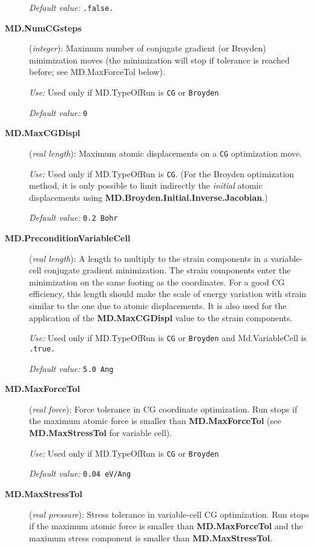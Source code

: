 \documentclass[11pt]{article}
\begin{document}
\begin{description}
{\it Default value:} {\tt .false.}


\item[{\bf MD.NumCGsteps}] ({\it integer}): 
Maximum number of conjugate gradient (or Broyden) minimization
moves (the minimization will stop
if tolerance is reached before; see MD.MaxForceTol below).

{\it Use:} Used only if MD.TypeOfRun is {\tt CG} or {\tt Broyden}
    
{\it Default value:} {\tt 0}

\item[{\bf MD.MaxCGDispl}] ({\it real length}): 
Maximum atomic displacements on a {\tt CG} optimization move.

{\it Use:} Used only if MD.TypeOfRun is {\tt CG}. (For the Broyden
optimization method, it is only possible to limit indirectly the {\it initial\/}
atomic displacements using {\bf MD.Broyden.Initial.Inverse.Jacobian}.)
    
{\it Default value:} {\tt 0.2 Bohr}


\item[{\bf MD.PreconditionVariableCell}] ({\it real length}):
A length to multiply to the strain components in a variable-cell conjugate
gradient minimization. The strain components enter the minimization
on the same footing as the coordinates. For a good CG efficiency, 
this length should make
the scale of energy variation with strain similar to the one 
due to atomic displacements. It is also
used for the application of the {\bf MD.MaxCGDispl} value to
the strain components.
 
{\it Use:} Used only if MD.TypeOfRun is {\tt CG} or {\tt Broyden} and
Md.VariableCell is {\tt .true.}
   
{\it Default value:} {\tt 5.0 Ang}
 
 
\item[{\bf MD.MaxForceTol}] ({\it real force}): 
Force tolerance in CG coordinate optimization.  
Run stops if the maximum atomic force is
smaller than {\bf MD.MaxForceTol} (see {\bf MD.MaxStressTol}
for variable cell).

{\it Use:} Used only if MD.TypeOfRun is {\tt CG} or {\tt Broyden}
    
{\it Default value:} {\tt 0.04 eV/Ang}


\item[{\bf MD.MaxStressTol}] ({\it real pressure}):
Stress tolerance in variable-cell CG optimization. Run stops
if the maximum atomic force is smaller than {\bf MD.MaxForceTol}
and the maximum stress component is smaller than {\bf MD.MaxStressTol}.


\end{description}
\end{document}
